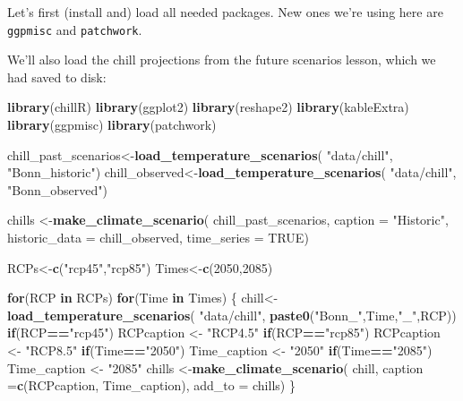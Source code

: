 \documentclass[
]{book}
\newenvironment{Shaded}{\begin{snugshade}}{\end{snugshade}}
\newcommand{\ControlFlowTok}[1]{\textcolor[rgb]{0.13,0.29,0.53}{\textbf{#1}}}
\newcommand{\DataTypeTok}[1]{\textcolor[rgb]{0.13,0.29,0.53}{#1}}
\newcommand{\DecValTok}[1]{\textcolor[rgb]{0.00,0.00,0.81}{#1}}
\newcommand{\KeywordTok}[1]{\textcolor[rgb]{0.13,0.29,0.53}{\textbf{#1}}}
\newcommand{\NormalTok}[1]{#1}
\newcommand{\OperatorTok}[1]{\textcolor[rgb]{0.81,0.36,0.00}{\textbf{#1}}}
\newcommand{\OtherTok}[1]{\textcolor[rgb]{0.56,0.35,0.01}{#1}}
\newcommand{\StringTok}[1]{\textcolor[rgb]{0.31,0.60,0.02}{#1}}
\begin{document}
Let's first (install and) load all needed packages. New ones we're using here are \texttt{ggpmisc} and \texttt{patchwork}.

We'll also load the chill projections from the future scenarios lesson, which we had saved to disk:

\begin{Shaded}
\begin{Highlighting}[]
\KeywordTok{library}\NormalTok{(chillR)}
\KeywordTok{library}\NormalTok{(ggplot2)}
\KeywordTok{library}\NormalTok{(reshape2)}
\KeywordTok{library}\NormalTok{(kableExtra)}
\KeywordTok{library}\NormalTok{(ggpmisc)}
\KeywordTok{library}\NormalTok{(patchwork)}

\NormalTok{chill_past_scenarios<-}\KeywordTok{load_temperature_scenarios}\NormalTok{(}
  \StringTok{"data/chill"}\NormalTok{,}
  \StringTok{"Bonn_historic"}\NormalTok{)}
\NormalTok{chill_observed<-}\KeywordTok{load_temperature_scenarios}\NormalTok{(}
  \StringTok{"data/chill"}\NormalTok{,}
  \StringTok{"Bonn_observed"}\NormalTok{)}

\NormalTok{chills <-}\KeywordTok{make_climate_scenario}\NormalTok{(}
\NormalTok{  chill_past_scenarios,}
  \DataTypeTok{caption =} \StringTok{"Historic"}\NormalTok{,}
  \DataTypeTok{historic_data =}\NormalTok{ chill_observed,}
  \DataTypeTok{time_series =} \OtherTok{TRUE}\NormalTok{)}

\NormalTok{RCPs<-}\KeywordTok{c}\NormalTok{(}\StringTok{"rcp45"}\NormalTok{,}\StringTok{"rcp85"}\NormalTok{)}
\NormalTok{Times<-}\KeywordTok{c}\NormalTok{(}\DecValTok{2050}\NormalTok{,}\DecValTok{2085}\NormalTok{)}

\ControlFlowTok{for}\NormalTok{(RCP }\ControlFlowTok{in}\NormalTok{ RCPs)}
  \ControlFlowTok{for}\NormalTok{(Time }\ControlFlowTok{in}\NormalTok{ Times)}
\NormalTok{  \{ chill<-}\KeywordTok{load_temperature_scenarios}\NormalTok{(}
    \StringTok{"data/chill"}\NormalTok{,}
    \KeywordTok{paste0}\NormalTok{(}\StringTok{"Bonn_"}\NormalTok{,Time,}\StringTok{"_"}\NormalTok{,RCP))}
    \ControlFlowTok{if}\NormalTok{(RCP}\OperatorTok{==}\StringTok{"rcp45"}\NormalTok{) RCPcaption <-}\StringTok{ "RCP4.5"}
    \ControlFlowTok{if}\NormalTok{(RCP}\OperatorTok{==}\StringTok{"rcp85"}\NormalTok{) RCPcaption <-}\StringTok{ "RCP8.5"}
    \ControlFlowTok{if}\NormalTok{(Time}\OperatorTok{==}\StringTok{"2050"}\NormalTok{) Time_caption <-}\StringTok{ "2050"}
    \ControlFlowTok{if}\NormalTok{(Time}\OperatorTok{==}\StringTok{"2085"}\NormalTok{) Time_caption <-}\StringTok{ "2085"}
\NormalTok{    chills <-}\KeywordTok{make_climate_scenario}\NormalTok{(}
\NormalTok{      chill,}
      \DataTypeTok{caption =}\KeywordTok{c}\NormalTok{(RCPcaption, Time_caption),}
      \DataTypeTok{add_to =}\NormalTok{ chills)}
\NormalTok{  \}}
\end{Highlighting}
\end{Shaded}
\end{document}
